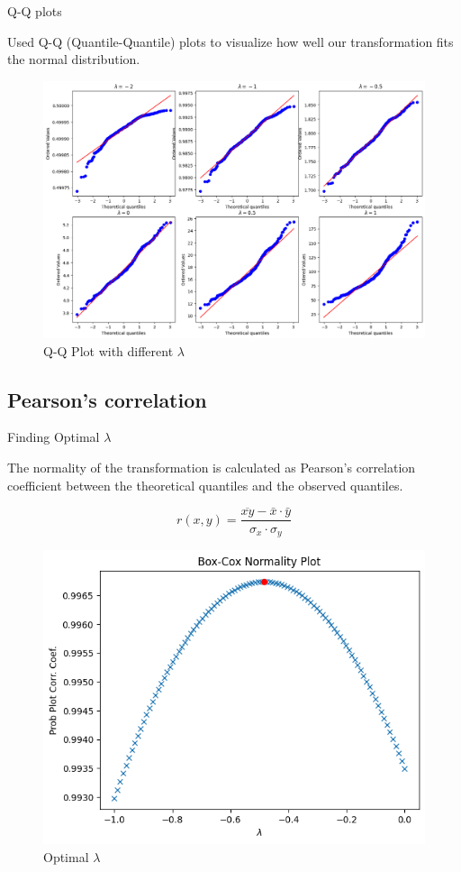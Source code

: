 \begin{frame}{Q-Q plots}

Used Q-Q (Quantile-Quantile) plots to visualize how well our transformation fits the normal distribution.

\vspace{0.25in}
\begin{figure}
  \centering
  \includegraphics[width=0.8\linewidth]{Project1/Report/images/q-q.png}
  \caption{Q-Q Plot with different $\lambda$}
\end{figure}

\end{frame}


\subsection{Pearson's correlation}

\begin{frame}{Finding Optimal $\lambda$}

The normality of the transformation is calculated as Pearson's correlation coefficient between the theoretical quantiles and the observed quantiles.

\[ r(x, y) = \frac{\overline{xy} - \bar{x} \cdot \bar{y}}{\sigma_x \cdot \sigma_y} \]

\vspace{0.25in}
\begin{figure}
  \centering
  \includegraphics[width=0.6\linewidth]{Project1/Report/images/normality.png}
  \caption{Optimal $\lambda$}
\end{figure}
  
\end{frame}

